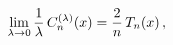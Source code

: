 \[\lim_{\lambda\to 0}\frac{1}{\lambda}\mathop{C^{(\lambda)}_{n}\/}\nolimits\!%
\left(x\right)=\frac{2}{n}\mathop{T_{n}\/}\nolimits\!\left(x\right),\]